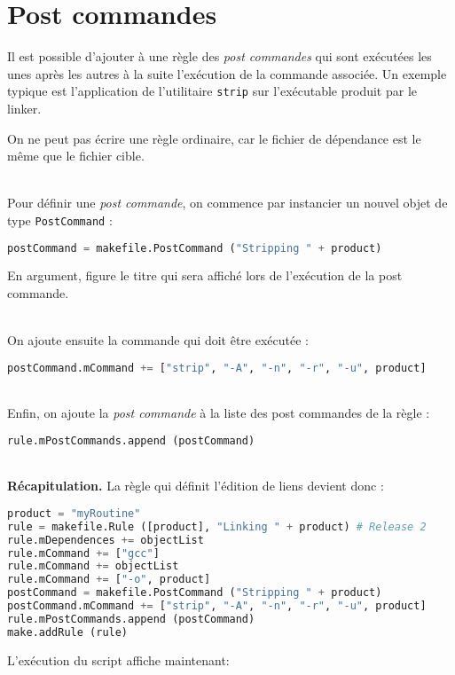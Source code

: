 \documentclass[a4paper,11pt]{extarticle}
\begin{document}
\section{Post commandes}

Il est possible d'ajouter à une règle des \emph{post commandes} qui sont exécutées les unes après les autres à la suite l'exécution de la commande associée. Un exemple typique est l'application de l'utilitaire \texttt{strip} sur l'exécutable produit par le linker.

On ne peut pas écrire une règle ordinaire, car le fichier de dépendance est le même que le fichier cible.

~\\Pour définir une \emph{post commande}, on commence par instancier un nouvel objet de type \texttt{PostCommand} :
\begin{lstlisting}[language=py]
postCommand = makefile.PostCommand ("Stripping " + product)
\end{lstlisting}
En argument, figure le titre qui sera affiché lors de l'exécution de la post commande.

~\\On ajoute ensuite la commande qui doit être exécutée :
\begin{lstlisting}[language=py]
postCommand.mCommand += ["strip", "-A", "-n", "-r", "-u", product]
\end{lstlisting}

~\\Enfin, on ajoute la \emph{post commande} à la liste des post commandes de la règle :
\begin{lstlisting}[language=py]
rule.mPostCommands.append (postCommand)
\end{lstlisting}


~\\{\bf Récapitulation.} La règle qui définit l'édition de liens devient donc :
\begin{lstlisting}[language=py]
product = "myRoutine"
rule = makefile.Rule ([product], "Linking " + product) # Release 2
rule.mDependences += objectList
rule.mCommand += ["gcc"]
rule.mCommand += objectList
rule.mCommand += ["-o", product]
postCommand = makefile.PostCommand ("Stripping " + product)
postCommand.mCommand += ["strip", "-A", "-n", "-r", "-u", product]
rule.mPostCommands.append (postCommand)
make.addRule (rule)
\end{lstlisting}

L'exécution du script affiche maintenant:
\end{document}
